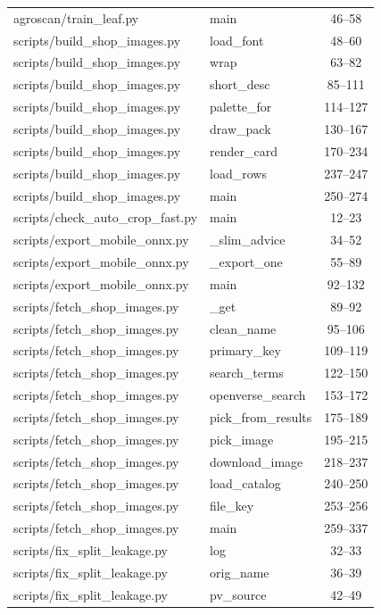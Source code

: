 \begin{center}
\begin{longtable}{@{}p{4.6cm}p{5.2cm}c@{}}
agroscan/train\_leaf.py & main & 46--58 \\
scripts/build\_shop\_images.py & load\_font & 48--60 \\
scripts/build\_shop\_images.py & wrap & 63--82 \\
scripts/build\_shop\_images.py & short\_desc & 85--111 \\
scripts/build\_shop\_images.py & palette\_for & 114--127 \\
scripts/build\_shop\_images.py & draw\_pack & 130--167 \\
scripts/build\_shop\_images.py & render\_card & 170--234 \\
scripts/build\_shop\_images.py & load\_rows & 237--247 \\
scripts/build\_shop\_images.py & main & 250--274 \\
scripts/check\_auto\_crop\_fast.py & main & 12--23 \\
scripts/export\_mobile\_onnx.py & \_slim\_advice & 34--52 \\
scripts/export\_mobile\_onnx.py & \_export\_one & 55--89 \\
scripts/export\_mobile\_onnx.py & main & 92--132 \\
scripts/fetch\_shop\_images.py & \_get & 89--92 \\
scripts/fetch\_shop\_images.py & clean\_name & 95--106 \\
scripts/fetch\_shop\_images.py & primary\_key & 109--119 \\
scripts/fetch\_shop\_images.py & search\_terms & 122--150 \\
scripts/fetch\_shop\_images.py & openverse\_search & 153--172 \\
scripts/fetch\_shop\_images.py & pick\_from\_results & 175--189 \\
scripts/fetch\_shop\_images.py & pick\_image & 195--215 \\
scripts/fetch\_shop\_images.py & download\_image & 218--237 \\
scripts/fetch\_shop\_images.py & load\_catalog & 240--250 \\
scripts/fetch\_shop\_images.py & file\_key & 253--256 \\
scripts/fetch\_shop\_images.py & main & 259--337 \\
scripts/fix\_split\_leakage.py & log & 32--33 \\
scripts/fix\_split\_leakage.py & orig\_name & 36--39 \\
scripts/fix\_split\_leakage.py & pv\_source & 42--49 \\

\end{longtable}
\end{center}

